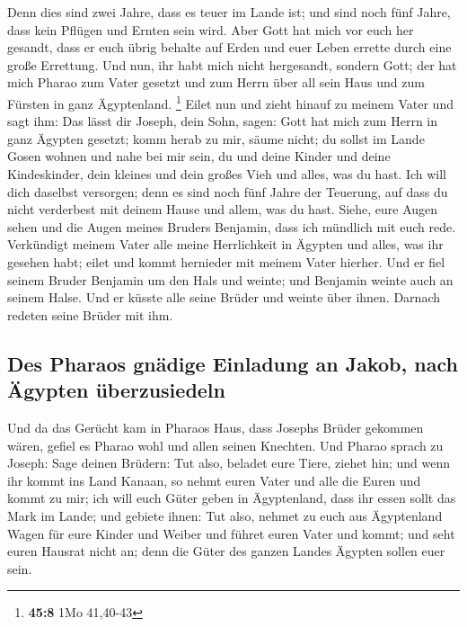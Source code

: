  Denn dies sind zwei Jahre, dass es teuer im Lande ist;
und sind noch fünf Jahre, dass kein Pflügen und Ernten sein wird.
 Aber Gott hat mich vor euch her gesandt, dass er euch
übrig behalte auf Erden und euer Leben errette durch eine große
Errettung.  Und nun, ihr habt mich nicht hergesandt,
sondern Gott; der hat mich Pharao zum Vater gesetzt und zum Herrn über
all sein Haus und zum Fürsten in ganz Ägyptenland. \footnote{\textbf{45:8}
  1Mo 41,40-43}  Eilet nun und zieht hinauf zu meinem
Vater und sagt ihm: Das lässt dir Joseph, dein Sohn, sagen: Gott hat
mich zum Herrn in ganz Ägypten gesetzt; komm herab zu mir, säume nicht;
 du sollst im Lande Gosen wohnen und nahe bei mir sein,
du und deine Kinder und deine Kindeskinder, dein kleines und dein großes
Vieh und alles, was du hast.  Ich will dich daselbst
versorgen; denn es sind noch fünf Jahre der Teuerung, auf dass du nicht
verderbest mit deinem Hause und allem, was du hast. 
Siehe, eure Augen sehen und die Augen meines Bruders Benjamin, dass ich
mündlich mit euch rede.  Verkündigt meinem Vater alle
meine Herrlichkeit in Ägypten und alles, was ihr gesehen habt; eilet und
kommt hernieder mit meinem Vater hierher.  Und er fiel
seinem Bruder Benjamin um den Hals und weinte; und Benjamin weinte auch
an seinem Halse.  Und er küsste alle seine Brüder und
weinte über ihnen. Darnach redeten seine Brüder mit ihm.

\hypertarget{des-pharaos-gnuxe4dige-einladung-an-jakob-nach-uxe4gypten-uxfcberzusiedeln}{%
\subsection{Des Pharaos gnädige Einladung an Jakob, nach Ägypten
überzusiedeln}\label{des-pharaos-gnuxe4dige-einladung-an-jakob-nach-uxe4gypten-uxfcberzusiedeln}}

 Und da das Gerücht kam in Pharaos Haus, dass Josephs
Brüder gekommen wären, gefiel es Pharao wohl und allen seinen Knechten.
 Und Pharao sprach zu Joseph: Sage deinen Brüdern: Tut
also, beladet eure Tiere, ziehet hin;  und wenn ihr kommt
ins Land Kanaan, so nehmt euren Vater und alle die Euren und kommt zu
mir; ich will euch Güter geben in Ägyptenland, dass ihr essen sollt das
Mark im Lande;  und gebiete ihnen: Tut also, nehmet zu
euch aus Ägyptenland Wagen für eure Kinder und Weiber und führet euren
Vater und kommt;  und seht euren Hausrat nicht an; denn
die Güter des ganzen Landes Ägypten sollen euer sein.

